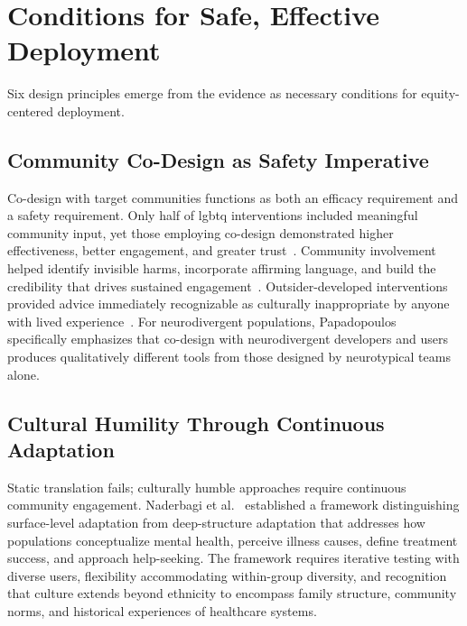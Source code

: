 \section{Conditions for Safe, Effective Deployment}

Six design principles emerge from the evidence as necessary conditions for equity-centered deployment.

\subsection{Community Co-Design as Safety Imperative}

Co-design with target communities functions as both an efficacy requirement and a safety requirement. Only half of \gls{lgbtq} interventions included meaningful community input, yet those employing co-design demonstrated higher effectiveness, better engagement, and greater trust~\cite{fowler_2023}. Community involvement helped identify invisible harms, incorporate affirming language, and build the credibility that drives sustained engagement~\cite{fowler_2023}. Outsider-developed interventions provided advice immediately recognizable as culturally inappropriate by anyone with lived experience~\cite{soubutts_2024}. For neurodivergent populations, Papadopoulos~\cite{papadopoulos_2025} specifically emphasizes that co-design with neurodivergent developers and users produces qualitatively different tools from those designed by neurotypical teams alone.

\subsection{Cultural Humility Through Continuous Adaptation}

Static translation fails; culturally humble approaches require continuous community engagement. Naderbagi et al.~\cite{naderbagi_2024} established a framework distinguishing surface-level adaptation from deep-structure adaptation that addresses how populations conceptualize mental health, perceive illness causes, define treatment success, and approach help-seeking. The framework requires iterative testing with diverse users, flexibility accommodating within-group diversity, and recognition that culture extends beyond ethnicity to encompass family structure, community norms, and historical experiences of healthcare systems.

